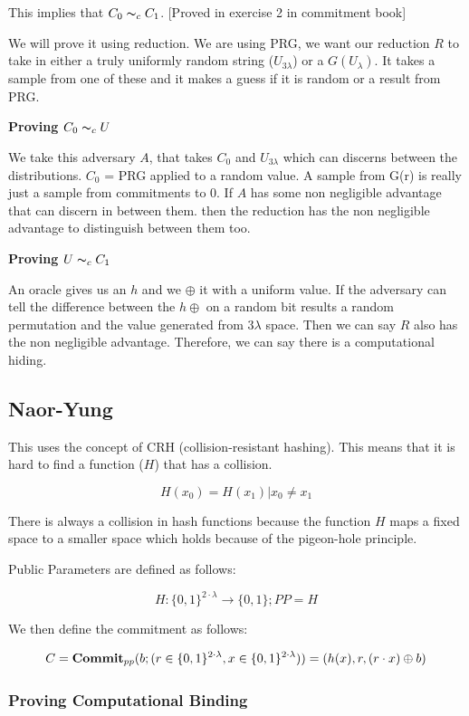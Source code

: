 \documentclass{article}
\begin{document}
This implies that $C_0 \thicksim_c C_1$. [Proved in exercise 2 in commitment book]

We will prove it using reduction. We are using PRG, we want our reduction $R$ to take in either a truly uniformly random string ($U_{3\lambda}$) or a $G(U_{\lambda})$. It takes a sample from one of these and it makes a guess if it is random or a result from PRG.

\textbf{Proving $C_0 \thicksim_c U$}

We take this adversary $A$, that takes $C_0$ and $U_{3\lambda}$ which can discerns between the distributions. $C_0$ = PRG applied to a random value. A sample from G(r) is really just a sample from commitments to $0$. If $A$ has some non negligible advantage that can discern in between them. then the reduction has the non negligible advantage to distinguish between them too.

\textbf{Proving $U \thicksim_c C_1$}

An oracle gives us an $h$ and we $\oplus$ it with a uniform value. If the adversary can tell the difference between the $h \oplus$ on a random bit results a random permutation and the value generated from $3\lambda$ space. Then we can say $R$ also has the non negligible advantage. Therefore, we can say there is a computational hiding.

\subsection{Naor-Yung}

This uses the concept of CRH (collision-resistant hashing). This means that it is hard to find a function ($H$) that has a collision.

$$
H(x_0) = H(x_1) | x_0 \neq x_1
$$

There is always a collision in hash functions because the function $H$ maps a fixed space to a smaller space which holds because of the pigeon-hole principle.

Public Parameters are defined as follows:

$$
H:\{0,1\}^{2\cdot \lambda} \rightarrow \{0,1\}; PP = H
$$

We then define the commitment as follows:

$$
C = \mathbf{Commit}_{pp}(b; (r \in \{0,1\}^{2\cdot \lambda}, x \in \{0,1\}^{2\cdot \lambda})) \\
= (h(x), r, (r \cdot x) \oplus b)
$$

\subsubsection{Proving Computational Binding}
\end{document}
